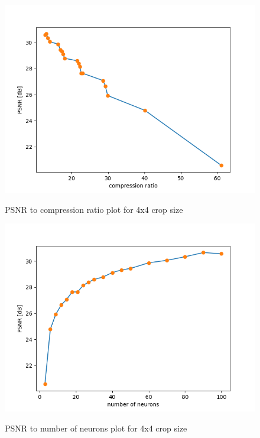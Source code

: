 \documentclass[../IDP_Task5_Karwowski_Kowalewski.tex]{subfiles}
\begin{document}
{{        \begin{figure}[!htbp]
            \centering
            \includegraphics[width=\textwidth]{img/kowalewski/compression_4.png}
            \label{fig:compression_4}
            \caption{PSNR to compression ratio plot for 4x4 crop size}
        \end{figure}

        \begin{figure}[!htbp]
            \centering
            \includegraphics[width=\textwidth]{img/kowalewski/neurons_4.png}
            \label{fig:neurons_4}
            \caption{PSNR to number of neurons plot for 4x4 crop size}
        \end{figure}
        \FloatBarrier
    }

}
\end{document}
